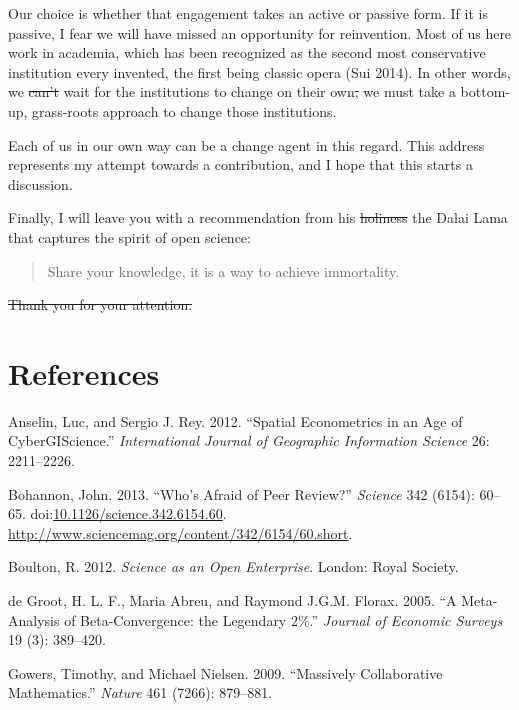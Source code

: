 \documentclass{article}
\providecommand{\DIFadd}[1]{{\protect\color{blue}\uwave{#1}}} %
\providecommand{\DIFdel}[1]{{\protect\color{red}\sout{#1}}}                      %
\providecommand{\DIFaddbegin}{} %
\providecommand{\DIFaddend}{} %
\providecommand{\DIFdelbegin}{} %
\providecommand{\DIFdelend}{} %
\begin{document}
Our choice is whether that engagement takes an active or passive form.
If it is passive, I fear we will have missed an opportunity for
reinvention. Most of us here work in academia, which has been recognized
as the second most conservative institution every invented, the first
being classic opera (Sui 2014). In other words, we \DIFdelbegin \DIFdel{can't }\DIFdelend \DIFaddbegin \DIFadd{cannot }\DIFaddend wait for the
institutions to change on their own\DIFdelbegin \DIFdel{, }\DIFdelend \DIFaddbegin \DIFadd{; }\DIFaddend we must take a bottom-up,
grass-roots approach to change those institutions.

Each of us in our own way can be a change agent in this regard. This
address represents my attempt towards a contribution, and I hope that
this starts a discussion.

Finally, I will leave you with a recommendation from his \DIFdelbegin \DIFdel{holiness }\DIFdelend \DIFaddbegin \DIFadd{Holiness }\DIFaddend the
Dalai Lama that captures the spirit of open science:

\begin{quote}
Share your knowledge, it is a way to achieve immortality.
\end{quote}

\DIFdelbegin \DIFdel{Thank you for your attention.
}%

\DIFdelend \section{References}\label{references}

Anselin, Luc, and Sergio J. Rey. 2012. ``Spatial Econometrics in an Age
of CyberGIScience.'' \emph{International Journal of Geographic
Information Science} 26: 2211--2226.

Bohannon, John. 2013. ``Who's Afraid of Peer Review?'' \emph{Science}
342 (6154): 60--65.
doi:\href{http://dx.doi.org/10.1126/science.342.6154.60}{10.1126/science.342.6154.60}.
\url{http://www.sciencemag.org/content/342/6154/60.short}.

Boulton, R. 2012. \emph{Science as an Open Enterprise}. London: Royal
Society.

{de Groot}, H. L. F., Maria Abreu, and Raymond J.G.M. Florax. 2005. ``A
Meta-Analysis of Beta-Convergence: the Legendary 2\%.'' \emph{Journal of
Economic Surveys} 19 (3): 389--420.

Gowers, Timothy, and Michael Nielsen. 2009. ``Massively Collaborative
Mathematics.'' \emph{Nature} 461 (7266): 879--881.
\end{document}
